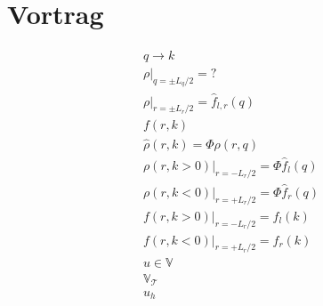 \section{Vortrag}
\begin{align*}
  q \longrightarrow k \\
  \rho|_{q=\pm L_q/2} = ?\\
  \rho|_{r=\pm L_r/2} = \hat{f}_{l,r}(q) \\
  f(r,k) \\
  \hat{\rho}(r,k) = \Phi \rho(r,q) \\
  \rho(r,k>0)|_{r=- L_r/2} = \Phi \hat{f}_{l}(q) \\
  \rho(r,k<0)|_{r=+ L_r/2} = \Phi \hat{f}_{r}(q) \\
  f(r,k>0)|_{r=- L_r/2} = f_{l}(k) \\
  f(r,k<0)|_{r=+ L_r/2} = f_{r}(k) \\
  u \in \mathbb{V} \\
  \mathbb{V}_{\mathcal{T}} \\
  u_h
\end{align*}

